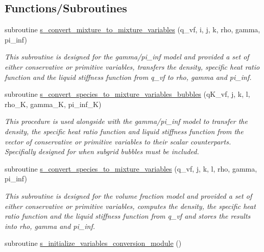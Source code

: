 \subsection*{Functions/\+Subroutines}
\begin{DoxyCompactItemize}
\item 
subroutine \hyperlink{namespacem__variables__conversion_ab76f1517a0d2503be8e1bfa7a8825485}{s\+\_\+convert\+\_\+mixture\+\_\+to\+\_\+mixture\+\_\+variables} (q\+\_\+vf, i, j, k, rho, gamma, pi\+\_\+inf)
\begin{DoxyCompactList}\small\item\em This subroutine is designed for the gamma/pi\+\_\+inf model and provided a set of either conservative or primitive variables, transfers the density, specific heat ratio function and the liquid stiffness function from q\+\_\+vf to rho, gamma and pi\+\_\+inf. \end{DoxyCompactList}\item 
subroutine \hyperlink{namespacem__variables__conversion_ae67d5c9a515446d7258b13341c1bfb0a}{s\+\_\+convert\+\_\+species\+\_\+to\+\_\+mixture\+\_\+variables\+\_\+bubbles} (q\+K\+\_\+vf, j, k, l, rho\+\_\+K, gamma\+\_\+K, pi\+\_\+inf\+\_\+K)
\begin{DoxyCompactList}\small\item\em This procedure is used alongside with the gamma/pi\+\_\+inf model to transfer the density, the specific heat ratio function and liquid stiffness function from the vector of conservative or primitive variables to their scalar counterparts. Specifially designed for when subgrid bubbles must be included. \end{DoxyCompactList}\item 
subroutine \hyperlink{namespacem__variables__conversion_add70754fa3c57535e4bc79c012962dc6}{s\+\_\+convert\+\_\+species\+\_\+to\+\_\+mixture\+\_\+variables} (q\+\_\+vf, j, k, l, rho, gamma, pi\+\_\+inf)
\begin{DoxyCompactList}\small\item\em This subroutine is designed for the volume fraction model and provided a set of either conservative or primitive variables, computes the density, the specific heat ratio function and the liquid stiffness function from q\+\_\+vf and stores the results into rho, gamma and pi\+\_\+inf. \end{DoxyCompactList}\item 
subroutine \hyperlink{namespacem__variables__conversion_a3645e5a02bfdcb5d3a8f68f9c00cb051}{s\+\_\+initialize\+\_\+variables\+\_\+conversion\+\_\+module} ()

\end{DoxyCompactItemize}
